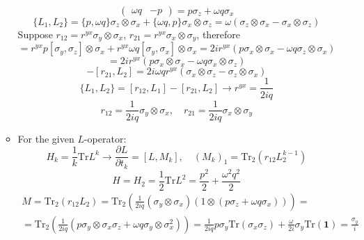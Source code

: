 \documentclass[12pt]{article}
\theoremstyle{definition}
\begin{document}
\begin{enumerate}
\begin{itemize}
\begin{equation}
\begin{pmatrix}
            \omega q & -p
        \end{pmatrix}=p\sigma_z+\omega q\sigma_x
        \end{equation}
        \begin{equation}
            \{L_1,L_2\}=\{p,\omega q\}\sigma_z\otimes\sigma_x+\{\omega q,p\}\sigma_x\otimes\sigma_z=\omega(\sigma_z\otimes \sigma_x-\sigma_x\otimes\sigma_z)
        \end{equation}
        Suppose $r_{12}=r^{yx}\sigma_y\otimes\sigma_x$, $r_{21}=r^{yx}\sigma_x\otimes\sigma_y$, therefore
        \begin{equation}
            [r_{12},L_1]=r^{yx}p[\sigma_y,\sigma_z]\otimes\sigma_x+r^{yx}\omega q[\sigma_y,\sigma_x]\otimes\sigma_x=2ir^{yx}(p\sigma_x\otimes\sigma_x-\omega q\sigma_z\otimes\sigma_x)
        \end{equation}
        \begin{equation}
            [r_{21},L_2]=2ir^{yx}(p\sigma_x\otimes\sigma_x-\omega q\sigma_x\otimes\sigma_z)
        \end{equation}
        \begin{equation}
            [r_{12},L_1]-[r_{21},L_2]=2i\omega qr^{yx}(\sigma_x\otimes\sigma_z-\sigma_z\otimes\sigma_x)
        \end{equation}
        \begin{equation}
            \{L_1,L_2\}=[r_{12},L_1]-[r_{21},L_2]\rightarrow r^{yx}=\frac{1}{2iq}
        \end{equation}
        \begin{equation}
            \boxed{r_{12}=\frac{1}{2iq}\sigma_y\otimes\sigma_x,\quad r_{21}=\frac{1}{2iq}\sigma_x\otimes\sigma_y}
        \end{equation}
        \item For the given $L$-operator:
        \begin{equation}
            H_k=\frac{1}{k}\text{Tr}L^k\rightarrow\frac{\partial L}{\partial t_k}=[L,M_k],\quad (M_k)_1=\text{Tr}_2(r_{12}L_2^{k-1})
        \end{equation}
        \begin{equation}
            H=H_2=\frac{1}{2}\text{Tr}L^2=\frac{p^2}{2}+\frac{\omega^2q^2}{2}
        \end{equation}
        \begin{multline}
            M=\text{Tr}_2(r_{12}L_2)=\text{Tr}_2\left(\frac{1}{2iq}(\sigma_y\otimes\sigma_x)(1\otimes (p\sigma_z+\omega q\sigma_x))\right)=\\=\text{Tr}_2\left(\frac{1}{2iq}(p\sigma_y\otimes\sigma_x\sigma_z+\omega q\sigma_y\otimes\sigma_x^2)\right)=\frac{1}{2iq}p\sigma_y\text{Tr}(\sigma_x\sigma_z)+\frac{\omega}{2i}\sigma_y\text{Tr}(\bm{1})=\frac{\sigma_y}{i}

\end{multline}
\end{itemize}
\end{enumerate}
\end{document}
